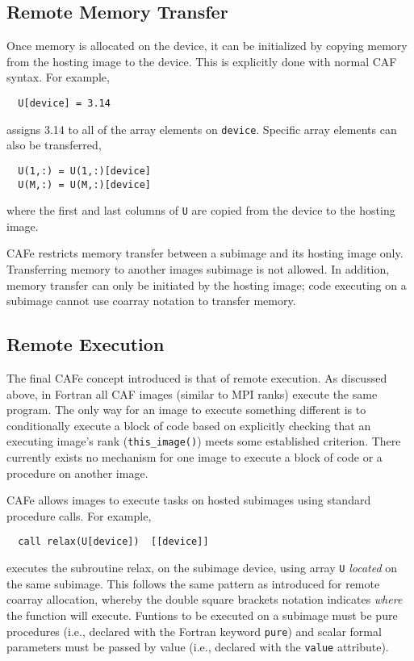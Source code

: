 \subsection{Remote Memory Transfer}

Once memory is allocated on the device, it can be initialized by copying memory from the
hosting image to the device.  This is explicitly done with normal CAF syntax.  For example,
\begin{verbatim}
  U[device] = 3.14
\end{verbatim}
assigns 3.14 to all of the array elements on \texttt{device}.  Specific array elements
can also be transferred, 
\begin{verbatim}
  U(1,:) = U(1,:)[device]
  U(M,:) = U(M,:)[device]
\end{verbatim}
where the first and last columns of \texttt{U} are copied from the device to the hosting image.

CAFe restricts memory transfer between a subimage and its hosting image only. Transferring
memory to another images subimage is not allowed.  In addition, memory transfer can only be
initiated by the hosting image; code executing on a subimage cannot use coarray notation to
transfer memory.

\subsection{Remote Execution}

The final CAFe concept introduced is that of remote execution.  As discussed above, in
Fortran all CAF images (similar to MPI ranks) execute the same program.  The only way for
an image to execute something different is to conditionally execute a block of code based
on explicitly checking that an executing image's rank (\texttt{this\_image()}) meets some
established criterion.  There currently exists no mechanism for one image to execute a
block of code or a procedure on another image.

CAFe allows images to execute tasks on hosted subimages using standard procedure calls.
For example,
\begin{verbatim}
  call relax(U[device])  [[device]]
\end{verbatim}
executes the subroutine relax, on the subimage device, using array \texttt{U} \emph{located}
on the same subimage.  This follows the same pattern as introduced for remote coarray allocation,
whereby the double square brackets notation indicates \emph{where} the function will execute.
Funtions to be executed on a subimage must be pure procedures (i.e., declared with the Fortran
keyword \texttt{pure}) and scalar formal parameters must be passed by value (i.e., declared with the
\texttt{value} attribute).

